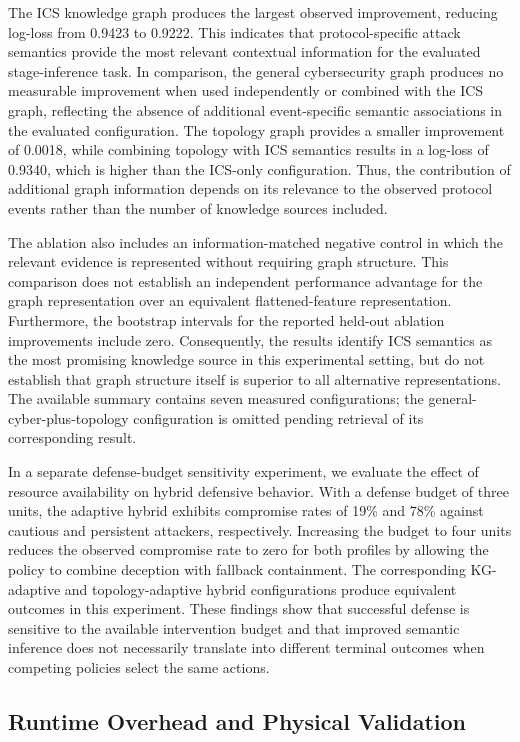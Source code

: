 \documentclass[10pt,conference]{IEEEtran}
\begin{document}
The ICS knowledge graph produces the largest observed improvement, reducing log-loss from 0.9423 to 0.9222. This indicates that protocol-specific attack semantics provide the most relevant contextual information for the evaluated stage-inference task. In comparison, the general cybersecurity graph produces no measurable improvement when used independently or combined with the ICS graph, reflecting the absence of additional event-specific semantic associations in the evaluated configuration. The topology graph provides a smaller improvement of 0.0018, while combining topology with ICS semantics results in a log-loss of 0.9340, which is higher than the ICS-only configuration. Thus, the contribution of additional graph information depends on its relevance to the observed protocol events rather than the number of knowledge sources included.

The ablation also includes an information-matched negative control in which the relevant evidence is represented without requiring graph structure. This comparison does not establish an independent performance advantage for the graph representation over an equivalent flattened-feature representation. Furthermore, the bootstrap intervals for the reported held-out ablation improvements include zero. Consequently, the results identify ICS semantics as the most promising knowledge source in this experimental setting, but do not establish that graph structure itself is superior to all alternative representations. The available summary contains seven measured configurations; the general-cyber-plus-topology configuration is omitted pending retrieval of its corresponding result.

In a separate defense-budget sensitivity experiment, we evaluate the effect of resource availability on hybrid defensive behavior. With a defense budget of three units, the adaptive hybrid exhibits compromise rates of 19\% and 78\% against cautious and persistent attackers, respectively. Increasing the budget to four units reduces the observed compromise rate to zero for both profiles by allowing the policy to combine deception with fallback containment. The corresponding KG-adaptive and topology-adaptive hybrid configurations produce equivalent outcomes in this experiment. These findings show that successful defense is sensitive to the available intervention budget and that improved semantic inference does not necessarily translate into different terminal outcomes when competing policies select the same actions.

\subsection{Runtime Overhead and Physical Validation}
\end{document}
